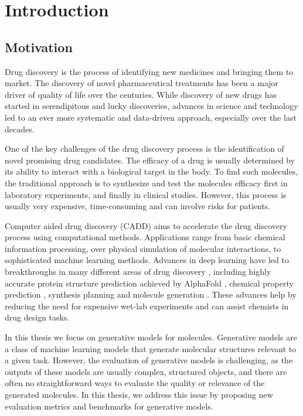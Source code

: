 \chapter{Introduction\label{chap:introduction}}
\section{Motivation}
Drug discovery is the process of identifying new medicines and bringing them to
market. The discovery of novel pharmaceutical treatments has been a major driver
of quality of life over the centuries. While discovery of new drugs has started 
in serendipitous and lucky discoveries, advances in science and technology  
led to an ever more systematic and data-driven approach, especially over the
last decades. 

One of the key challenges of the drug discovery process is the identification
of novel promising drug candidates. The efficacy of a drug is usually determined by its ability
to interact with a biological target in the body. To find such molecules,
the traditional approach is to synthesize and test the molecules efficacy first in laboratory
experiments, and finally in clinical studies. However, this process is usually very expensive, time-consuming
and can involve risks for patients.

Computer aided drug discovery (CADD) aims to accelerate the drug discovery
process using computational methods. Applications range from basic chemical
information processing, over physical simulation of molecular interactions, to
sophisticated machine learning methods. Advances in deep learning
have led to breakthroughs in many different
areas of drug discovery \citep{chenRiseDeepLearning2018}, including highly accurate protein structure prediction 
achieved by AlphaFold \citep{todo}, chemical property prediction
\citep{mayrDeepToxToxicityPrediction2016,todo}, synthesis planning
\citep{seglerNeuralSymbolicMachineLearning2017} and molecule generation
\citep{todo}. These advances help by reducing the need for expensive 
wet-lab experiments and can assist chemists in drug design tasks. 

In this thesis we focus on generative models for molecules. Generative models
are a class of machine learning models that generate molecular structures
relevant to a given task. However, the evaluation of generative models is
challenging, as the outputs of these models are usually complex, structured
objects, and there are often no straightforward ways to evaluate the quality or
relevance of the generated molecules. In this thesis, we address this issue by
proposing new evaluation metrics and benchmarks for generative models.

